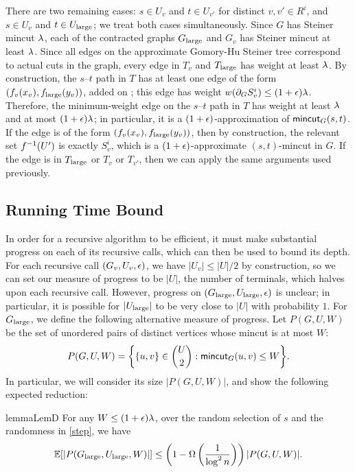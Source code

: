 There are two remaining cases: $s\in U_v$ and $t\in U_{v'}$ for distinct $v,v'\in R^i$, and $s\in U_v$ and $t\in U_{\textup{large}}$; we treat both cases simultaneously. Since $G$ has Steiner mincut $\lambda$, each of the contracted graphs $G_{\textup{large}}$ and $G_v$ has Steiner mincut at least $\lambda$. Since all edges on the approximate Gomory-Hu Steiner tree correspond to actual cuts in the graph, every edge in $T_v$ and $T_{\textup{large}}$ has weight at least $\lambda$. By construction, the $s$--$t$ path in $T$ has at least one edge of the form $(f_v(x_v),f_{\textup{large}}(y_v))$, added on ; this edge has weight $w(\partial_GS^i_v)\le(1+\epsilon)\lambda$. Therefore, the minimum-weight edge on the $s$--$t$ path in $T$ has weight at least $\lambda$ and at most $(1+\epsilon)\lambda$; in particular, it is a $(1+\epsilon)$-approximation of $\textsf{\textup{mincut}}_G(s,t)$. If the edge is of the form $(f_v(x_v),f_{\textup{large}}(y_v))$, then by construction, the relevant set $f^{-1}(U')$ is exactly $S^i_v$, which is a $(1+\epsilon)$-approximate $(s,t)$-mincut in $G$. If the edge is in $T_{\textup{large}}$ or $T_v$ or $T_{v'}$, then we can apply the same arguments used previously. %
\EP

\subsection{Running Time Bound}

In order for a recursive algorithm to be efficient, it must make substantial progress on each of its recursive calls, which can then be used to bound its depth. For each recursive call $(G_v,U_v,\epsilon)$, we have $|U_v|\le|U|/2$ by construction, so we can set our measure of progress to be $|U|$, the number of terminals, which halves upon each recursive call.
However, progress on $(G_{\textup{large}},U_{\textup{large}},\epsilon)$ is unclear; in particular, it is possible for $|U_{\textup{large}}|$ to be very close to $|U|$ with probability $1$. For $G_{\textup{large}}$, we define the following alternative measure of progress. Let $P(G,U,W)$ be the set of unordered pairs of distinct vertices whose mincut is at most $W$:
\[ P(G,U,W) = \bigg\{ \{u,v\}\in\binom U2:\textsf{\textup{mincut}}_G(u,v)\le W \bigg\} .\]
In particular, we will consider its size $|P(G,U,W)|$, and show the following expected reduction:

\begin{restatable}{lemma}{LemD}
For any $W\le(1+\epsilon)\lambda$, over the random selection of $s$ and the randomness in \ref{step}, we have
\[ \mathbb E[|P(G_{\textup{large}},U_{\textup{large}},W)|] \le \left(1-\Omega\left(\frac1{\log^2n}\right)\right)|P(G,U,W)| .\]
\end{restatable}

